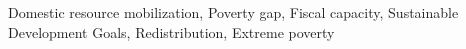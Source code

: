 Domestic resource mobilization, Poverty gap, Fiscal capacity, Sustainable Development Goals, Redistribution, Extreme poverty